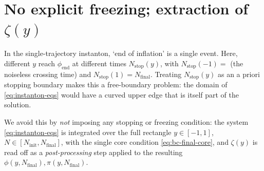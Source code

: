 \documentclass[a4paper,11pt]{article}
\newcommand{\Ny}{N}                          %
\newcommand{\Ninit}{N_{\mathrm{init}}}       %
\newcommand{\Nfinal}{N_{\mathrm{final}}}     %
\newcommand{\field}{\phi}                    %
\newcommand{\mom}{\pi}                       %
\newcommand{\phiend}{\field_{\mathrm{end}}}
\newcommand{\yco}{y}                         %
\newcommand{\zprofile}{\zeta}                %
\begin{document}
\section{No explicit freezing; extraction of $\zprofile(\yco)$}
\label{sec:zeta-extraction}

In the single-trajectory instanton, `end of inflation' is a single event.
Here, different $\yco$ reach $\phiend$ at different times
$\Ny_{\mathrm{stop}}(\yco)$, with $\Ny_{\mathrm{stop}}(-1) = $ (the noiseless
crossing time) and $\Ny_{\mathrm{stop}}(1) = \Nfinal$. Treating
$\Ny_{\mathrm{stop}}(\yco)$ as an a priori stopping boundary makes this a
free-boundary problem: the domain of \eqref{eq:instanton-eqs} would have a
curved upper edge that is itself part of the solution.

We avoid this by \emph{not} imposing any stopping or freezing condition:
the system \eqref{eq:instanton-eqs} is integrated over the full rectangle
$\yco\in[-1,1]$, $\Ny\in[\Ninit,\Nfinal]$, with the single core condition
\eqref{eq:bc-final-core}, and $\zprofile(\yco)$ is read off as a
\emph{post-processing} step applied to the resulting $\field(\yco,\Nfinal),
\mom(\yco,\Nfinal)$.
\end{document}

